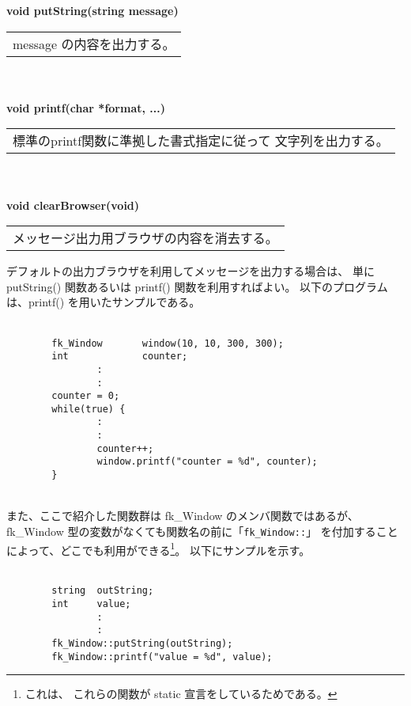 \begin{tabbing}
\> \textbf{void putString(string message)} \\
	\> \> \begin{tabular}{p{15cm}}
		message の内容を出力する。
	\end{tabular} \\ \\

\> \textbf{void printf(char *format, ...)} \\
	\> \> \begin{tabular}{p{15cm}}
		標準のprintf関数に準拠した書式指定に従って
		文字列を出力する。
	\end{tabular} \\ \\

\> \textbf{void clearBrowser(void)} \\
	\> \> \begin{tabular}{p{15cm}}
		メッセージ出力用ブラウザの内容を消去する。
	\end{tabular}
\end{tabbing}
デフォルトの出力ブラウザを利用してメッセージを出力する場合は、
単に putString() 関数あるいは printf() 関数を利用すればよい。
以下のプログラムは、printf() を用いたサンプルである。\\ ~
\begin{screen}
\begin{verbatim}
        fk_Window       window(10, 10, 300, 300);
        int             counter;
                :
                :
        counter = 0;
        while(true) {
                :
                :
                counter++;
                window.printf("counter = %d", counter);
        }
\end{verbatim}
\end{screen} ~ \\
また、ここで紹介した関数群は fk\_Window のメンバ関数ではあるが、
fk\_Window 型の変数がなくても関数名の前に「\verb+fk_Window::+」
を付加することによって、どこでも利用ができる\footnote{これは、
これらの関数が static 宣言をしているためである。}。
以下にサンプルを示す。\\ ~
\begin{screen}
\begin{verbatim}
        string  outString;
        int     value;
                :
                :
        fk_Window::putString(outString);
        fk_Window::printf("value = %d", value);
\end{verbatim}
\end{screen}
